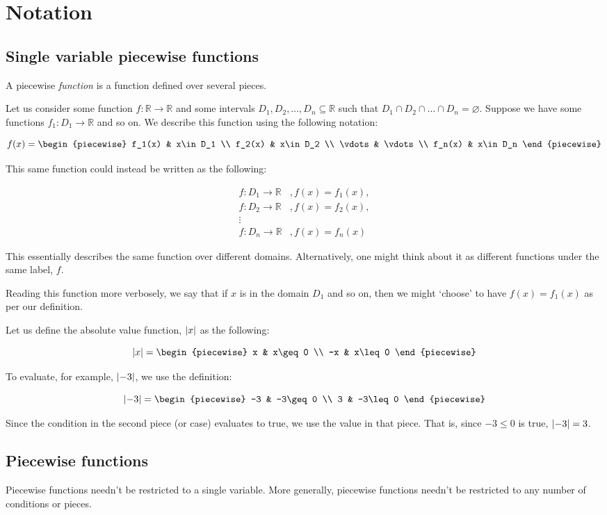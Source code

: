 \section{Notation}
\subsection{Single variable piecewise functions}
A piecewise \textit{function} is a function defined over several pieces. 

Let us consider some function $f:\mathbb{R}\to\mathbb{R}$ and some intervals ${D_1,D_2,\dots,D_n\subseteq\mathbb{R}}$ such that ${D_1\cap D_2\cap \dots\cap D_n=\varnothing}$. Suppose we have some functions $f_1: D_1\to\mathbb{R}$ and so on. We describe this function using the following notation:

$$
    f(x) = \begin{piecewise} 
        f_1(x) & x\in D_1 \\
        f_2(x) & x\in D_2 \\
        \vdots & \vdots \\
        f_n(x) & x\in D_n
    \end{piecewise}
$$

This same function could instead be written as the following:

\begin{align*}
    f:D_1\to\mathbb{R}&, f(x)=f_1(x), \\
    f:D_2\to\mathbb{R}&, f(x)=f_2(x), \\
    \vdots \\
    f:D_n\to\mathbb{R}&, f(x)=f_n(x)
\end{align*}

This essentially describes the same function over different domains. Alternatively, one might think about it as different functions under the same label, $f$.

Reading this function more verbosely, we say that if $x$ is in the domain $D_1$ and so on, then we might `choose' to have $f(x)=f_1(x)$ as per our definition.

\begin{example}
    Let us define the absolute value function, $\abs{x}$ as the following:

    $$
        \abs{x} = \begin{piecewise}
            x & x\geq 0 \\
            -x & x\leq 0
        \end{piecewise}
    $$

    To evaluate, for example, $\abs{-3}$, we use the definition:

    $$
        \abs{-3} = \begin{piecewise}
            -3 & -3\geq 0 \\
            3 & -3\leq 0
        \end{piecewise}
    $$

    Since the condition in the second piece (or case) evaluates to true, we use the value in that piece. That is, since $-3\leq 0$ is true, $\abs{-3}=3$.
\end{example}

\subsection{Piecewise functions}
Piecewise functions needn't be restricted to a single variable. More generally, piecewise functions needn't be restricted to any number of conditions or pieces.

\newpage{}